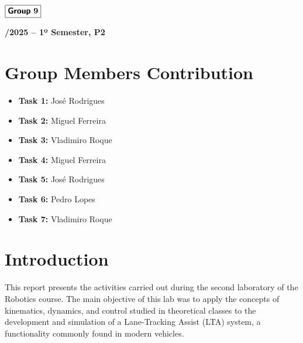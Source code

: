 \documentclass[12pt]{article}
\begin{document}
\begin{flushleft}
    \large $\boxed{\text{\bf \fontfamily{cmss}\selectfont Group} \ \textbf{9}}$\\[4.0cm]
\end{flushleft}
    
\begin{center}
    \large \bf {}/2025 -- 1º Semester, P2
\end{center}

\thispagestyle{empty}

\setcounter{page}{0}

\newpage

\tableofcontents 

\newpage

\section{Group Members Contribution} 

\begin{itemize}
    \item \textbf{Task 1:} José Rodrigues
    \item  \textbf{Task 2:} Miguel Ferreira
    \item  \textbf{Task 3:} Vladimiro Roque
    \item  \textbf{Task 4:} Miguel Ferreira
    \item  \textbf{Task 5:} José Rodrigues
    \item  \textbf{Task 6:} Pedro Lopes
    \item  \textbf{Task 7:} Vladimiro Roque
\end{itemize}


\section{Introduction} 

This report presents the activities carried out during the second laboratory of the Robotics course. The main objective of this lab was to apply the concepts of kinematics, dynamics, and control studied in theoretical classes to the development and simulation of a Lane-Tracking Assist (LTA) system, a functionality commonly found in modern vehicles.
\end{document}
